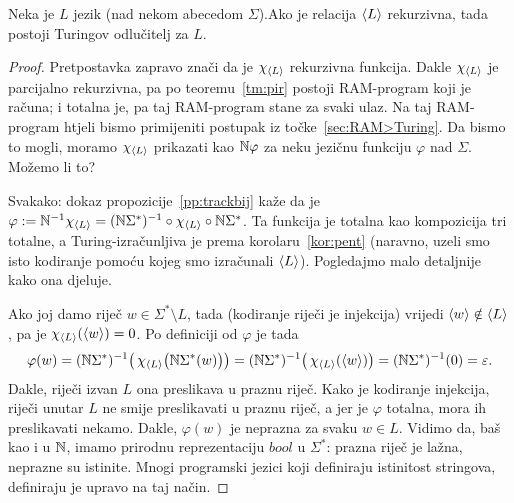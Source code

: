 \begin{teorem}[{name=[Turing-odlučivost rekurzivnog jezika]}]\label{tm:krio}
Neka je $L$ jezik (nad nekom abecedom $\Sigma$).\newline Ako je relacija $\langle L\rangle$ rekurzivna, tada postoji Turingov odlučitelj za $L$.
\end{teorem}
\begin{proof}
Pretpostavka zapravo znači da je $\chi_{\langle L\rangle}$ rekurzivna funkcija. Dakle $\chi_{\langle L\rangle}$ je parcijalno rekurzivna, pa po teoremu~\ref{tm:pir} postoji RAM-program koji je računa; i totalna je, pa taj RAM-program stane za svaki ulaz. Na taj RAM-program htjeli bismo primijeniti postupak iz točke~\ref{sec:RAM>Turing}. Da bismo to mogli, moramo $\chi_{\langle L\rangle}$ prikazati kao ${\mathbb N}\varphi$ za neku jezičnu funkciju $\varphi$ nad $\Sigma$. Možemo li to?

Svakako: dokaz propozicije~\ref{pp:trackbij} kaže da je $\varphi:={\mathbb N}^{-1}\chi_{\langle L\rangle}=({\mathbb N}\Sigma^*)^{-1}\circ\chi_{\langle L\rangle}\circ{\mathbb N}\Sigma^*$. Ta funkcija je totalna kao kompozicija tri totalne, a Turing-izračunljiva je prema korolaru~\ref{kor:pent} (naravno, uzeli smo isto kodiranje pomoću kojeg smo izračunali $\langle L\rangle$). Pogledajmo malo detaljnije kako ona djeluje.

Ako joj damo riječ $w\in\Sigma^*\setminus L$, tada (kodiranje riječi je injekcija) vrijedi $\langle w\rangle\notin\langle L\rangle$, pa je $\chi_{\langle L\rangle}(\langle w\rangle)=0$. Po definiciji od $\varphi$ je tada
\begin{equation}
    \varphi(w)=({\mathbb N}\Sigma^*)^{-1}\bigl(\,\chi_{\langle L\rangle}\bigl({\mathbb N}\Sigma^*(w)\bigr)\bigr)=({\mathbb N}\Sigma^*)^{-1}\bigl(\,\chi_{\langle L\rangle}(\langle w\rangle)\bigr)=({\mathbb N}\Sigma^*)^{-1}(0)=\varepsilon\text.
\end{equation}
Dakle, riječi izvan $L$ ona preslikava u praznu riječ. Kako je kodiranje injekcija, riječi unutar $L$ ne smije preslikavati u praznu riječ, a jer je $\varphi$ totalna, mora ih preslikavati nekamo. Dakle, $\varphi(w)$ je neprazna za svaku $w\in L$.
Vidimo da, baš kao i u ${\mathbb N}$, imamo prirodnu reprezentaciju $bool$ u $\Sigma^*$: prazna riječ je lažna, neprazne su istinite. Mnogi programski jezici koji definiraju istinitost stringova, definiraju je upravo na taj način.



\end{proof}
